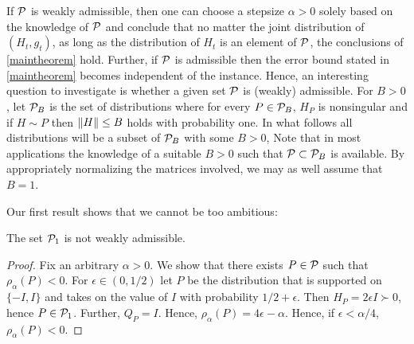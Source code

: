 If $\mathcal{P}$ is weakly admissible, then one can choose a stepsize $\alpha>0$ solely based on the knowledge of $\mathcal{P}$ and 
conclude that no matter the joint distribution of $(H_t,g_t)$, as long as the distribution of $H_t$ is an element of $\mathcal{P}$, the conclusions of \cref{maintheorem} hold. Further, if $\mathcal{P}$ is admissible then the error bound stated in  \cref{maintheorem} becomes independent of the instance.
Hence, an interesting question to investigate is whether a given set $\mathcal{P}$ is (weakly) admissible.
For $B>0$, let $\mathcal{P}_B$ is the set of distributions where for every $P\in \mathcal{P}_B$, 
$H_P$ is nonsingular and if $H\sim P$ then $\left\| H\right\|\le B$ holds with probability one.
In what follows all distributions will be a subset of $\mathcal{P}_B$ with some $B>0$, 
Note that in most applications the knowledge of a suitable $B>0$ such that $\mathcal{P}\subset \mathcal{P}_B$ is available.
By appropriately normalizing the matrices involved, we may as well assume that $B=1$.

Our first result shows that we cannot be too ambitious:
\begin{proposition}
The set $\mathcal{P}_1$ is not weakly admissible.
\end{proposition}
\begin{proof}
Fix an arbitrary $\alpha>0$. We show that there exists $P\in \mathcal{P}$ such that $\rho_\alpha(P)<0$.
For $\epsilon \in (0,1/2)$ let $P$ be the distribution that is supported on $\{-I,I\}$ and takes on the value of $I$ with probability $1/2+\epsilon$. Then $H_P = 2\epsilon I \succ 0$, hence $P\in \mathcal{P}_1$. Further, $Q_P = I$.
Hence, $\rho_\alpha(P) = 4\epsilon-\alpha$. Hence, if $\epsilon<\alpha/4$, $\rho_\alpha(P)<0$.
\end{proof}

